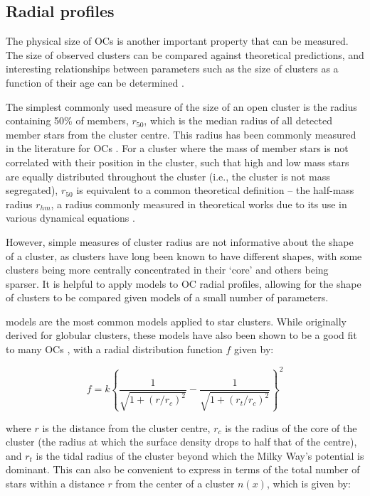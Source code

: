 \subsection{Radial profiles}
\label{sec:intro:theory:profile}

The physical size of OCs is another important property that can be measured. The size of observed clusters can be compared against theoretical predictions, and interesting relationships between parameters such as the size of clusters as a function of their age can be determined \citep{tarricq_structural_2022}.

The simplest commonly used measure of the size of an open cluster is the radius containing 50\% of members, $r_{50}$, which is the median radius of all detected member stars from the cluster centre. This radius has been commonly measured in the literature for OCs \citep[e.g.][]{cantat-gaudin_gaia_2018,cantat-gaudin_clusters_2020}. For a cluster where the mass of member stars is not correlated with their position in the cluster, such that high and low mass stars are equally distributed throughout the cluster (i.e., the cluster is not mass segregated), $r_{50}$ is equivalent to a common theoretical definition -- the half-mass radius $r_{hm}$, a radius commonly measured in theoretical works due to its use in various dynamical equations \citep{portegies_zwart_young_2010}.

However, simple measures of cluster radius are not informative about the shape of a cluster, as clusters have long been known to have different shapes, with some clusters being more centrally concentrated in their `core' and others being sparser. It is helpful to apply models to OC radial profiles, allowing for the shape of clusters to be compared given models of a small number of parameters.

\citep{king_structure_star_1962} models are the most common models applied to star clusters. While originally derived for globular clusters, these models have also been shown to be a good fit to many OCs \citep[e.g. in ][]{piskunov_towards_2007}, with a radial distribution function $f$ given by:

\begin{equation}
	f = k \left\{ \frac{1}{\sqrt{1 + \left(r/r_c\right)^2}} - \frac{1}{\sqrt{1 + \left(r_t/r_c\right)^2}} \right\}^2
\end{equation}

\noindent
where $r$ is the distance from the cluster centre, $r_c$ is the radius of the core of the cluster (the radius at which the surface density drops to half that of the centre), and $r_t$ is the tidal radius of the cluster beyond which the Milky Way's potential is dominant. This can also be convenient to express in terms of the total number of stars within a distance $r$ from the center of a cluster $n(x)$, which is given by:

